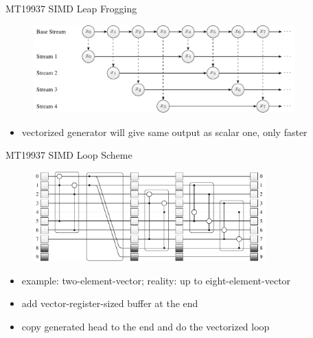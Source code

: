 \documentclass[aspectratio=169]{beamer}
\begin{document}
    \begin{frame}{MT19937 SIMD Leap Frogging}
      \begin{figure}
        \includegraphics[width=0.9\textwidth]{figures/leapfrogging_multiple_streams.pdf}
      \end{figure}
      \begin{itemize}
        \item vectorized generator will give same output as scalar one, only faster
      \end{itemize}
    \end{frame}

    \begin{frame}{MT19937 SIMD Loop Scheme}
      \begin{figure}
        \includegraphics[width=0.8\textwidth]{figures/mt19937_vector_loop_scheme.pdf}
      \end{figure}
      \begin{itemize}
        \pause
        \item example: two-element-vector; reality: up to eight-element-vector
        \pause
        \item add vector-register-sized buffer at the end
        \pause
        \item copy generated head to the end and do the vectorized loop
      \end{itemize}
    \end{frame}
\end{document}
